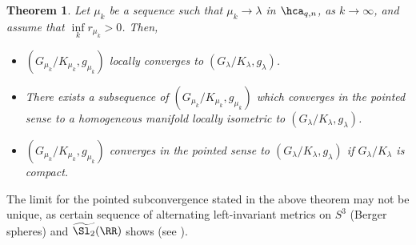 \documentclass[11pt]{amsart}
\theoremstyle{plain}
\newtheorem{theorem}{Theorem}[section]
\theoremstyle{definition}
\theoremstyle{remark}
\begin{document}
\begin{theorem}\label{convmu2}\cite[Theorem 6.14]{spacehm}
Let $\mu_k$ be a sequence such that $\mu_k\to\lambda$ in $\hca_{q,n}$, as $k\to\infty$, and assume that $\inf\limits_k r_{\mu_k}>0$.  Then,
\begin{itemize}
\item[(i)] $(G_{\mu_k}/K_{\mu_k},g_{\mu_k})$ locally converges to $(G_{\lambda}/K_{\lambda},g_{\lambda})$.

\item[(ii)] There exists a subsequence of $(G_{\mu_k}/K_{\mu_k},g_{\mu_k})$ which converges in the pointed sense to a homogeneous manifold locally isometric to $(G_{\lambda}/K_{\lambda},g_{\lambda})$.

\item[(iii)] $(G_{\mu_k}/K_{\mu_k},g_{\mu_k})$ converges in the pointed sense to $(G_{\lambda}/K_{\lambda},g_{\lambda})$ if $G_\lambda/K_\lambda$ is compact.
\end{itemize}
\end{theorem}


The limit for the pointed subconvergence stated in the above theorem may not be unique, as certain sequence of alternating left-invariant metrics on $S^3$ (Berger spheres) and $\widetilde{\Sl_2}(\RR)$ shows (see \cite[Example 6.17]{spacehm}).
\end{document}
